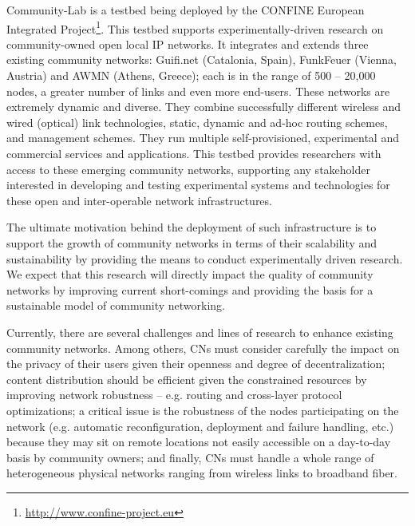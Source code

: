 \documentclass[conference]{IEEEtran}
\begin{document}
Community-Lab is a testbed being deployed by the CONFINE European
Integrated Project\footnote{\url{http://www.confine-project.eu}}. This testbed supports experimentally-driven research
on community-owned open local IP networks. It integrates and extends 
three existing community networks: Guifi.net (Catalonia, Spain),
FunkFeuer (Vienna, Austria) and AWMN (Athens, Greece); each is in the
range of 500 -- 20,000 nodes, a greater number of links and even more end-users.
These networks are extremely dynamic and diverse. They combine
successfully different wireless and wired (optical) link technologies, static, dynamic
and ad-hoc routing schemes, and management schemes. They run multiple
self-provisioned, experimental and commercial services and applications.
This testbed provides researchers with access to these emerging
community networks, supporting any stakeholder interested in developing
and testing experimental systems and technologies for these open
and inter-operable network infrastructures.


The ultimate motivation behind the deployment of such infrastructure is 
to support the growth of community networks in terms of their scalability and
sustainability by providing the means to conduct experimentally driven research. 
We expect that this research will directly impact the quality of community networks
by improving current short-comings and providing the basis for a sustainable
model of community networking.


Currently, there are several challenges and lines of research to enhance existing
community networks. Among others, CNs must consider carefully the impact on the privacy of their
users given their openness and degree of decentralization; content distribution 
should be efficient given the constrained resources by improving network robustness 
-- e.g. routing and cross-layer protocol optimizations; a critical issue is the
robustness of the nodes participating on the network (e.g. automatic reconfiguration,
deployment and failure handling, etc.) because they may sit on remote locations not
easily accessible on a day-to-day basis by community owners; and finally, CNs must handle a whole range
of heterogeneous physical networks ranging from wireless links to broadband fiber.
\end{document}
